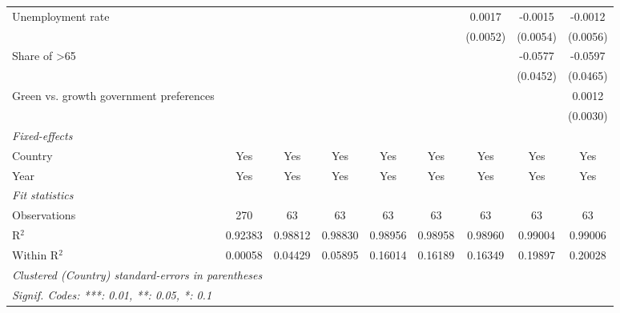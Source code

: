\begin{table}[htbp]
\begin{tabular}{lcccccccc}
      Unemployment rate                                       &          &          &          &                &                & 0.0017         & -0.0015        & -0.0012\\   
                                                              &          &          &          &                &                & (0.0052)       & (0.0054)       & (0.0056)\\   
      Share of >65                                            &          &          &          &                &                &                & -0.0577        & -0.0597\\   
                                                              &          &          &          &                &                &                & (0.0452)       & (0.0465)\\   
      Green vs. growth government preferences                 &          &          &          &                &                &                &                & 0.0012\\   
                                                              &          &          &          &                &                &                &                & (0.0030)\\   
      \midrule
      \emph{Fixed-effects}\\
      Country                                                 & Yes      & Yes      & Yes      & Yes            & Yes            & Yes            & Yes            & Yes\\  
      Year                                                    & Yes      & Yes      & Yes      & Yes            & Yes            & Yes            & Yes            & Yes\\  
      \midrule
      \emph{Fit statistics}\\
      Observations                                            & 270      & 63       & 63       & 63             & 63             & 63             & 63             & 63\\  
      R$^2$                                                   & 0.92383  & 0.98812  & 0.98830  & 0.98956        & 0.98958        & 0.98960        & 0.99004        & 0.99006\\  
      Within R$^2$                                            & 0.00058  & 0.04429  & 0.05895  & 0.16014        & 0.16189        & 0.16349        & 0.19897        & 0.20028\\  
      \midrule \midrule
      \multicolumn{9}{l}{\emph{Clustered (Country) standard-errors in parentheses}}\\
      \multicolumn{9}{l}{\emph{Signif. Codes: ***: 0.01, **: 0.05, *: 0.1}}\\
   \end{tabular}
\end{table}


